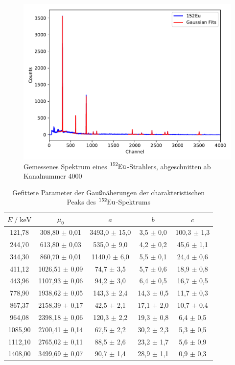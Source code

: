 \begin{figure}[H]
  \centering
  \includegraphics[scale=0.7]{content/plot1.pdf}
  \caption{Gemessenes Spektrum eines $\ce{^{152}Eu}$-Strahlers, abgeschnitten ab Kanalnummer $\num{4000}$}
  \label{fig:plot1}
\end{figure}

\begin{table}
  \centering
  \caption{Gefittete Parameter der Gaußnäherungen der charakteristischen Peaks des $\ce{^{152}Eu}$-Spektrums}
  \label{tab:mess1}
  \begin{tabular}{c c c c c}
  \toprule
  $ E \;/\; \si{\kilo\eV}$ & $\mu_0$ & $a$ & $b$ & $c$ \\
  \midrule
        121,78 &  308,80 $\pm$ 0,01 & 3493,0 $\pm$ 15,0 &  3,5 $\pm$ 0,0 & 100,3 $\pm$ 1,3 \\
        244,70 &  613,80 $\pm$ 0,03 &  535,0 $\pm$  9,0 &  4,2 $\pm$ 0,2 &  45,6 $\pm$ 1,1 \\
        344,30 &  860,70 $\pm$ 0,01 & 1140,0 $\pm$  6,0 &  5,5 $\pm$ 0,1 &  24,4 $\pm$ 0,6 \\
        411,12 & 1026,51 $\pm$ 0,09 &   74,7 $\pm$  3,5 &  5,7 $\pm$ 0,6 &  18,9 $\pm$ 0,8 \\
        443,96 & 1107,93 $\pm$ 0,06 &   94,2 $\pm$  3,0 &  6,4 $\pm$ 0,5 &  16,7 $\pm$ 0,5 \\
        778,90 & 1938,62 $\pm$ 0,05 &  143,3 $\pm$  2,4 & 14,3 $\pm$ 0,5 &  11,7 $\pm$ 0,3 \\
        867,37 & 2158,39 $\pm$ 0,17 &   42,5 $\pm$  2,1 & 17,1 $\pm$ 2,0 &  10,7 $\pm$ 0,4 \\
        964,08 & 2398,18 $\pm$ 0,06 &  120,3 $\pm$  2,2 & 19,3 $\pm$ 0,8 &   6,4 $\pm$ 0,5 \\
       1085,90 & 2700,41 $\pm$ 0,14 &   67,5 $\pm$  2,2 & 30,2 $\pm$ 2,3 &   5,3 $\pm$ 0,5 \\
       1112,10 & 2765,02 $\pm$ 0,11 &   88,5 $\pm$  2,6 & 23,2 $\pm$ 1,7 &   5,6 $\pm$ 0,9 \\
       1408,00 & 3499,69 $\pm$ 0,07 &   90,7 $\pm$  1,4 & 28,9 $\pm$ 1,1 &   0,9 $\pm$ 0,3 \\
  \bottomrule
  \end{tabular}
  \end{table}

